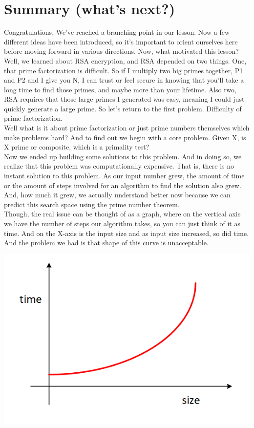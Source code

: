 \documentclass{report}
\begin{document}
\section{Summary (what's next?)}
Congratulations. We've reached a branching point in our lesson. Now a few different ideas have been introduced, so it's important to orient ourselves here before moving forward in various directions. Now, what motivated this lesson? \\
Well, we learned about RSA encryption, and RSA depended on two things. One, that prime factorization is difficult. So if I multiply two big primes together, P1 and P2 and I give you N, I can trust or feel secure in knowing that you'll take a long time to find those primes, and maybe more than your lifetime. Also two, RSA requires that those large primes I generated was easy, meaning I could just quickly generate a large prime. So let's return to the first problem. Difficulty of prime factorization.\\
Well what is it about prime factorization or just prime numbers themselves which make problems hard? And to find out we begin with a core problem. Given X, is X prime or composite, which is a primality test? \\
Now we ended up building some solutions to this problem. And in doing so, we realize that this problem was computationally expensive. That is, there is no instant solution to this problem. As our input number grew, the amount of time or the amount of steps involved for an algorithm to find the solution also grew. And, how much it grew, we actually understand better now because we can predict this search space using the prime number theorem. \\
Though, the real issue can be thought of as a graph, where on the vertical axis we have the number of steps our algorithm takes, so you can just think of it as time. And on the X-axis is the input size and as input size increased, so did time. And the problem we had is that shape of this curve is unacceptable.
\begin{center}
	\includegraphics[scale=1]{68.png}
\end{center}
\end{document}
